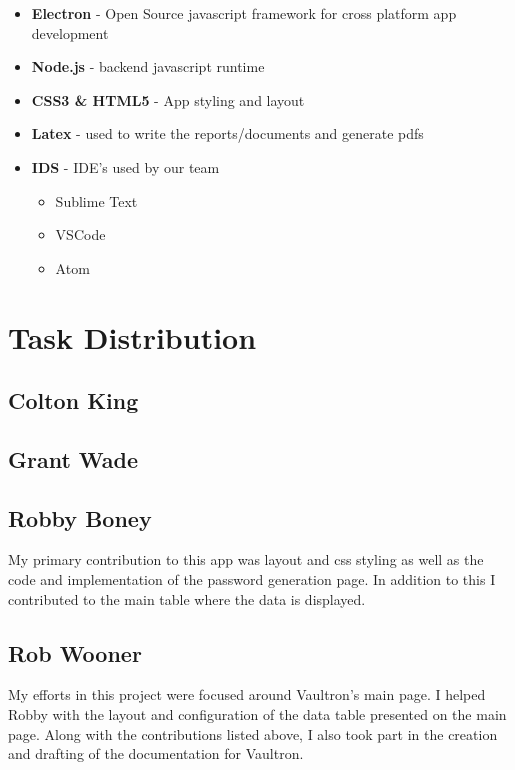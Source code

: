 \documentclass[11pt]{report}
\begin{document}
\begin{itemize}
    \item \textbf{Electron} - Open Source javascript framework for cross platform app development
    \item \textbf{Node.js} - backend javascript runtime
    \item \textbf{CSS3 \& HTML5} - App styling and layout
    \item \textbf{Latex} - used to write the reports/documents and generate pdfs
    \item \textbf{IDS} - IDE's used by our team 
        \begin{itemize}
            \item Sublime Text
            \item VSCode
            \item Atom
        \end{itemize}
\end{itemize}


\section{Task Distribution}

\subsection{Colton King}

\subsection{Grant Wade}

\subsection{Robby Boney}
My primary contribution to this app was layout and css styling as well as the 
code and implementation of the password generation page. In addition to this
I contributed to the main table where the data is displayed.

\subsection{Rob Wooner}
My efforts in this project were focused around Vaultron's main page. I helped
Robby with the layout and configuration of the data table presented on the main
page. Along with the contributions listed above, I also took part in the creation 
and drafting of the documentation for Vaultron.
\end{document}
